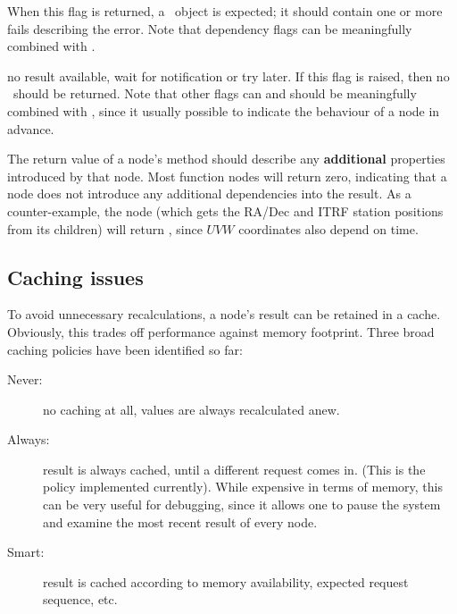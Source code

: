 \documentclass[10pt]{article}
\begin{document}
\begin{description}
    When this flag is returned, a \Result\ object is expected; it should
    contain one or more fails describing the error. Note that dependency flags
    can be meaningfully combined with .

  \item[\RES{WAIT}:] no result available, wait for notification or try later.
    If this flag is raised, then no \Result\ should be returned. Note that
    other flags can and should be meaningfully combined with , since
    it usually possible to indicate the behaviour of a node in advance.
    
  \end{description}
  
  The return value of a node's  method should describe any {\bf
  additional} properties introduced by that node. Most function nodes will
  return zero, indicating that a node does not introduce any additional
  dependencies into the result. As a counter-example, the  node (which
  gets the RA/Dec and ITRF station positions from its children) will return
  , since $UVW$ coordinates also depend on time.

\subsection{Caching issues}

  To avoid unnecessary recalculations, a node's result can be retained in a
  cache. Obviously, this trades off performance against memory footprint. Three
  broad caching policies have been identified so far:

  \begin{description}
  
  \item[Never:] no caching at all, values are always recalculated anew. 
   
  \item[Always:] result is always cached, until a different request comes in.
    (This is the policy implemented currently). While expensive in terms of
    memory, this can be very useful for debugging, since it allows one to pause
    the system and examine the most recent result of every node.

  \item[Smart:] result is cached according to memory availability, expected
    request sequence, etc.

  \end{description}
  
\end{document}

